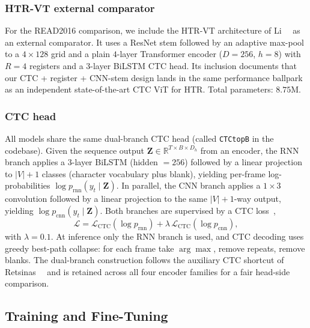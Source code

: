 \subsubsection{HTR-VT external comparator}

For the READ2016 comparison, we include the HTR-VT architecture of Li~\etal~\cite{li2024htrvt} as an external comparator. It uses a ResNet stem followed by an adaptive max-pool to a $4 \times 128$ grid and a plain $4$-layer Transformer encoder ($D = 256$, $h = 8$) with $R = 4$ registers and a $3$-layer BiLSTM CTC head. Its inclusion documents that our CTC + register + CNN-stem design lands in the same performance ballpark as an independent state-of-the-art CTC ViT for HTR. Total parameters: $8.75$M.

\subsubsection{CTC head}
\label{sec:heads}

All models share the same dual-branch CTC head (called \texttt{CTCtopB} in the codebase). Given the sequence output $\mathbf{Z} \in \mathbb{R}^{T \times B \times D_h}$ from an encoder, the RNN branch applies a $3$-layer BiLSTM (hidden $= 256$) followed by a linear projection to $|V|+1$ classes (character vocabulary plus blank), yielding per-frame log-probabilities $\log p_{\mathrm{rnn}}(y_t \mid \mathbf{Z})$. In parallel, the CNN branch applies a $1 \times 3$ convolution followed by a linear projection to the same $|V|+1$-way output, yielding $\log p_{\mathrm{cnn}}(y_t \mid \mathbf{Z})$. Both branches are supervised by a CTC loss~\cite{graves2006ctc},
\begin{equation}
\label{eq:ctc_loss}
\mathcal{L} = \mathcal{L}_{\mathrm{CTC}}(\log p_{\mathrm{rnn}}) + \lambda \, \mathcal{L}_{\mathrm{CTC}}(\log p_{\mathrm{cnn}}),
\end{equation}
with $\lambda = 0.1$. At inference only the RNN branch is used, and CTC decoding uses greedy best-path collapse: for each frame take $\arg\max$, remove repeats, remove blanks. The dual-branch construction follows the auxiliary CTC shortcut of Retsinas~\etal~\cite{retsinas2022htrbestpractices} and is retained across all four encoder families for a fair head-side comparison.

\subsection{Training and Fine-Tuning}
\label{sec:training}

